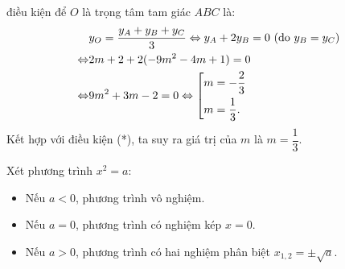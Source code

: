 \begin{bt}
{		điều kiện để $O$ là trọng tâm tam giác $ ABC$ là:
		{\allowdisplaybreaks
			\begin{align*}
			&y_O=\dfrac{y_A+y_B+y_C}{3}\Leftrightarrow y_A+2y_B=0\,\, \text{(do $y_B=y_C$)}\\
			\Leftrightarrow &2m+2+2(-9m^2-4m+1)=0\\
			\Leftrightarrow &9m^2+3m-2=0
			\Leftrightarrow \left[\begin{aligned}&m =  - \dfrac{2}{3}\\&m = \dfrac{1}{3}.\end{aligned}\right.
			\end{align*}}
		Kết hợp với điều kiện (*), ta suy ra giá trị của $m$ là $m=\dfrac{1}{3}.$
	}
\end{bt}

\begin{note} Xét phương trình $x^2=a:$
	\begin{itemize}
		\item Nếu $a<0$, phương trình vô nghiệm.
		\item Nếu $a=0$, phương trình có nghiệm kép $x=0$.
		\item Nếu $a>0$, phương trình có hai nghiệm phân biệt $x_{1, 2}=\pm \sqrt{a}$.
	\end{itemize}
\end{note}


